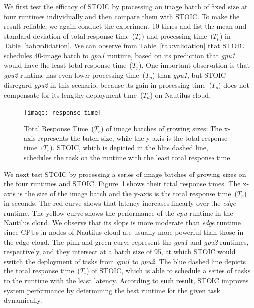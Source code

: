 We first test the efficacy of STOIC by processing an image batch of fixed size at four runtimes individually and then compare them with STOIC. To make the result reliable, we again conduct the experiment 10 times and list the mean and standard deviation of total response time~($T_r$) and processing time~($T_p$) in Table~\ref{tab:validation}. We can observe from Table~\ref{tab:validation} that STOIC schedules 40-image batch to \textit{gpu1} runtime, based on its prediction that  \textit{gpu1} would have the least total response time~($T_r$). One important observation is that \textit{gpu2} runtime has even lower processing time~($T_p$) than \textit{gpu1}, but STOIC disregard \textit{gpu2} in this scenario, because its gain in processing time~($T_p$) does not compensate for its lengthy deployment time~($T_d$) on Nautilus cloud.

\begin{figure}[t] \centering 
\texttt{[image: response-time]}
\caption{Total Response Time~($T_r$) of image batches of growing sizes: The x-axis represents the batch size, while the y-axis is the total response time~($T_r$). STOIC, which is depicted in the blue dashed line, schedules the task on the runtime with the least total response time.  
\label{fig:response-time}}
\end{figure}

We next test STOIC by processing a series of image batches of growing sizes on the four runtimes and STOIC. Figure~\ref{fig:response-time} shows their total response times. The x-axis is the size of the image batch and the y-axis is the total response time~($T_r$) in seconds. The red curve shows that latency
increases linearly over the \textit{edge} runtime.  The yellow curve shows the performance of the \textit{cpu} runtime in the Nautilus cloud. 
We observe that its slope is more moderate than \textit{edge} runtime since CPUs in nodes of Nautilus cloud are usually more powerful than those in the edge cloud. The pink and green curve represent the \textit{gpu1} and \textit{gpu2} runtimes, respectively, and they intersect at a batch size of 95, at which STOIC would switch the deployment of tasks from \textit{gpu1} to \textit{gpu2}. The blue dashed line depicts the total response time~($T_r$) of STOIC, which is able to schedule a series of tasks to the runtime with the least latency. According to such result, STOIC improves system performance by determining the best runtime
for the given task dynamically.




